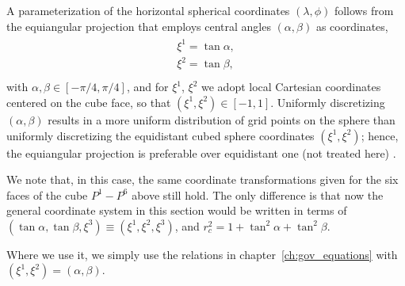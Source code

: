 \documentclass{report}
\begin{document}


A parameterization of the horizontal spherical coordinates $(\lambda, \phi)$ follows from the equiangular projection that employs central angles $(\alpha, \beta)$ as coordinates,
\begin{align}
    \begin{array}{l}
        \xi^1 = \tan{\alpha}, \\
        \xi^2 = \tan{\beta} , \\
    \end{array}
\end{align}
with $\alpha, \beta \in [- \pi/4, \pi/4]$, and for $\xi^1$, $\xi^2$ we adopt local Cartesian coordinates centered on the cube face, so that $(\xi^1, \xi^2) \in [-1, 1]$. Uniformly discretizing $(\alpha, \beta)$ results in a more uniform distribution of grid points on the sphere than uniformly discretizing the equidistant cubed sphere coordinates $(\xi^1, \xi^2)$; hence, the equiangular projection is preferable over equidistant one (not treated here) \citep{Rancic1996, Nair2005}. 

We note that, in this case, the same coordinate transformations given for the six faces of the cube $P^1-P^6$ above still hold. The only difference is that now the general coordinate system in this section would be written in terms of $(\tan \alpha, \tan \beta, \xi^3) \equiv (\xi^1, \xi^2, \xi^3)$, and $r_c^2 = 1 + \tan^2 \alpha + \tan^2 \beta$.

Where we use it, we simply use the relations in chapter~\ref{ch:gov_equations} with $(\xi^1, \xi^2) = (\alpha, \beta)$.
\end{document}
